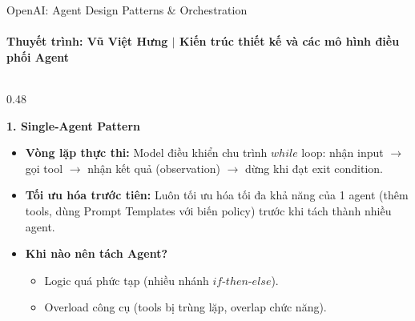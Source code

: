 \documentclass[aspectratio=1610,10pt,xcolor={table}]{beamer}
\begin{document}
\begin{frame}{OpenAI: Agent Design Patterns \& Orchestration}
  \framesubtitle{Thuyết trình: Vũ Việt Hưng $\vert$ Kiến trúc thiết kế và các mô hình điều phối Agent}

  \begin{columns}[t]
    \begin{column}{0.48\textwidth}
      \begin{block}{\textbf{1. Single-Agent Pattern}}
        \scriptsize
        \begin{itemize}\scriptsize
          \item \textbf{Vòng lặp thực thi:} Model điều khiển chu trình $while$ loop: nhận input $\to$ gọi tool $\to$ nhận kết quả (observation) $\to$ dừng khi đạt exit condition.
          \item \textbf{Tối ưu hóa trước tiên:} Luôn tối ưu hóa tối đa khả năng của 1 agent (thêm tools, dùng Prompt Templates với biến policy) trước khi tách thành nhiều agent.
          \item \textbf{Khi nào nên tách Agent?}
            \begin{itemize}\scriptsize
              \item Logic quá phức tạp (nhiều nhánh $if\text{-}then\text{-}else$).
              \item Overload công cụ (tools bị trùng lặp, overlap chức năng).
            \end{itemize}
        \end{itemize}
      \end{block}
    \end{column}


\end{columns}
\end{frame}
\end{document}
